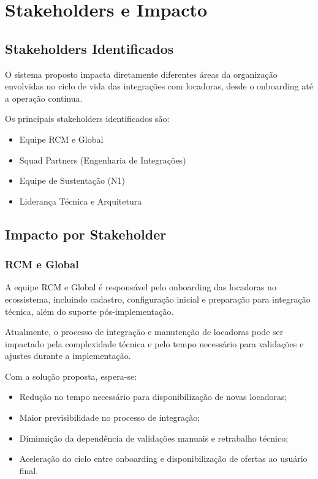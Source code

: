 \section{Stakeholders e Impacto}

\subsection{Stakeholders Identificados}

O sistema proposto impacta diretamente diferentes áreas da organização envolvidas no ciclo de vida das integrações com locadoras, desde o onboarding até a operação contínua.

Os principais stakeholders identificados são:

\begin{itemize}
    \item Equipe RCM e Global
    \item Squad Partners (Engenharia de Integrações)
    \item Equipe de Sustentação (N1)
    \item Liderança Técnica e Arquitetura
\end{itemize}

\subsection{Impacto por Stakeholder}

\subsubsection{RCM e Global}

A equipe RCM e Global é responsável pelo onboarding das locadoras no ecossistema, incluindo cadastro, configuração inicial e preparação para integração técnica, além do suporte pós-implementação.

Atualmente, o processo de integração e manutenção de locadoras pode ser impactado pela complexidade técnica e pelo tempo necessário para validações e ajustes durante a implementação.

Com a solução proposta, espera-se:

\begin{itemize}
    \item Redução no tempo necessário para disponibilização de novas locadoras;
    \item Maior previsibilidade no processo de integração;
    \item Diminuição da dependência de validações manuais e retrabalho técnico;
    \item Aceleração do ciclo entre onboarding e disponibilização de ofertas ao usuário final.
\end{itemize}

